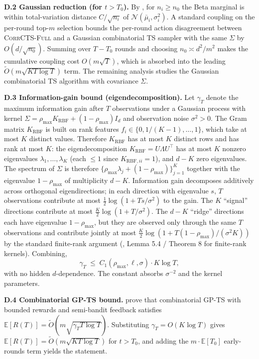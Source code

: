 \documentclass{article}
\theoremstyle{plain}
\theoremstyle{definition}
\theoremstyle{remark}
\newcommand{\E}{\mathbb{E}}
\newcommand{\CorrFull}{\textsc{CorrCTS-Full}}
\begin{document}
\textbf{D.2 Gaussian reduction (for $t > T_0$).}
By , for $n_i \geq n_0$ the Beta marginal is within total-variation distance $C/\sqrt{n_i}$ of $\mathcal{N}(\bar\mu_i, \sigma_i^2)$.
A standard coupling on the per-round top-$m$ selection bounds the per-round action disagreement between \CorrFull{} and a Gaussian combinatorial TS sampler with the same $\Sigma$ by $O(d/\sqrt{n_0})$.
Summing over $T - T_0$ rounds and choosing $n_0 \asymp d^2 / m^2$ makes the cumulative coupling cost $O(m\sqrt{T})$, which is absorbed into the leading $\tilde O(m\sqrt{KT\log T})$ term.
The remaining analysis studies the Gaussian combinatorial TS algorithm with covariance $\Sigma$.

\textbf{D.3 Information-gain bound (eigendecomposition).}
Let $\gamma_T$ denote the maximum information gain after $T$ observations under a Gaussian process with kernel $\Sigma = \rho_{\max} K_{\mathrm{RBF}} + (1 - \rho_{\max}) I_d$ and observation noise $\sigma^2 > 0$.
The Gram matrix $K_{\mathrm{RBF}}$ is built on rank features $f_i \in \{0, 1/(K-1), \ldots, 1\}$, which take at most $K$ distinct values.
Therefore $K_{\mathrm{RBF}}$ has at most $K$ distinct rows and has rank at most $K$: the eigendecomposition $K_{\mathrm{RBF}} = U \Lambda U^\top$ has at most $K$ nonzero eigenvalues $\lambda_1, \ldots, \lambda_K$ (each $\leq 1$ since $K_{\mathrm{RBF},ii} = 1$), and $d - K$ zero eigenvalues.
The spectrum of $\Sigma$ is therefore $\{\rho_{\max} \lambda_j + (1 - \rho_{\max})\}_{j=1}^K$ together with the eigenvalue $1 - \rho_{\max}$ of multiplicity $d - K$.
Information gain decomposes additively across orthogonal eigendirections; in each direction with eigenvalue $s$, $T$ observations contribute at most $\frac{1}{2}\log(1 + T s / \sigma^2)$ to the gain.
The $K$ ``signal'' directions contribute at most $\frac{K}{2}\log(1 + T/\sigma^2)$.
The $d - K$ ``ridge'' directions each have eigenvalue $1 - \rho_{\max}$, but they are observed only through the same $T$ observations and contribute jointly at most $\frac{K}{2}\log(1 + T(1-\rho_{\max})/(\sigma^2 K))$ by the standard finite-rank argument (\citealp{srinivas2010gpucb}, Lemma 5.4 / Theorem 8 for finite-rank kernels).
Combining,
\[
\gamma_T \;\leq\; C_1(\rho_{\max}, \ell, \sigma) \cdot K \log T,
\]
with no hidden $d$-dependence. The constant absorbs $\sigma^{-2}$ and the kernel parameters.

\textbf{D.4 Combinatorial GP-TS bound.}
\citet{sandberg2025bayesian} prove that combinatorial GP-TS with bounded rewards and semi-bandit feedback satisfies $\E[R(T)] = \tilde O(m \sqrt{\gamma_T T \log T})$.
Substituting $\gamma_T = O(K \log T)$ gives $\E[R(T)] = \tilde O(m \sqrt{K T \log T})$ for $t > T_0$, and adding the $m \cdot \E[T_0]$ early-rounds term yields the statement.
\end{document}

